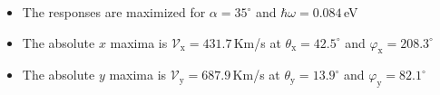 \documentclass{beamer}
\begin{document}
\begin{frame}
\begin{columns}
\begin{center}
{\small

\vspace{-2mm}
\begin{itemize}

\item The responses are maximized for $\alpha = 35^{\circ}$ and $\hbar \omega =
0.084$\,eV
\item The absolute $x$ maxima is 
$\mathcal{V}_{\mathrm{x}} = 431.7$\,Km/s at
$\theta_{\mathrm{x}} = 42.5^{\circ}$ and
$\varphi_{\mathrm{x}} = 208.3^{\circ}$

\item The absolute $y$ maxima is 
$\mathcal{V}_{\mathrm{y}} = 687.9$\,Km/s at 
$\theta_{\mathrm{y}} =13.9^{\circ}$ and
$\varphi_{\mathrm{y}} = 82.1^{\circ}$

\end{itemize}

}


\end{center}


\end{columns}

\end{frame}

\end{document}

